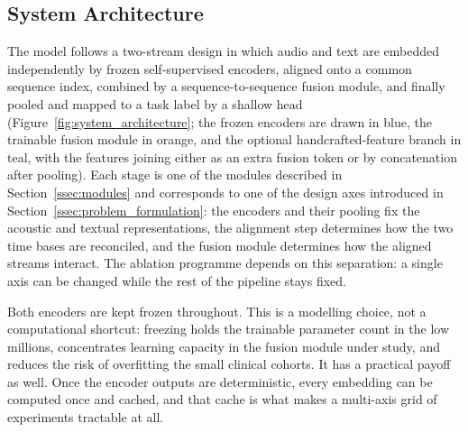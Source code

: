 \documentclass[a4paper,12pt]{article}
\begin{document}
\subsection{System Architecture}
\label{ssec:architecture}

The model follows a two-stream design in which audio and text are embedded independently by frozen self-supervised encoders, aligned onto a common sequence index, combined by a sequence-to-sequence fusion module, and finally pooled and mapped to a task label by a shallow head (Figure~\ref{fig:system_architecture}; the frozen encoders are drawn in blue, the trainable fusion module in orange, and the optional handcrafted-feature branch in teal, with the features joining either as an extra fusion token or by concatenation after pooling). Each stage is one of the modules described in Section~\ref{ssec:modules} and corresponds to one of the design axes introduced in Section~\ref{ssec:problem_formulation}: the encoders and their pooling fix the acoustic and textual representations, the alignment step determines how the two time bases are reconciled, and the fusion module determines how the aligned streams interact. The ablation programme depends on this separation: a single axis can be changed while the rest of the pipeline stays fixed.

Both encoders are kept frozen throughout. This is a modelling choice, not a computational shortcut: freezing holds the trainable parameter count in the low millions, concentrates learning capacity in the fusion module under study, and reduces the risk of overfitting the small clinical cohorts. It has a practical payoff as well. Once the encoder outputs are deterministic, every embedding can be computed once and cached, and that cache is what makes a multi-axis grid of experiments tractable at all.
\end{document}
